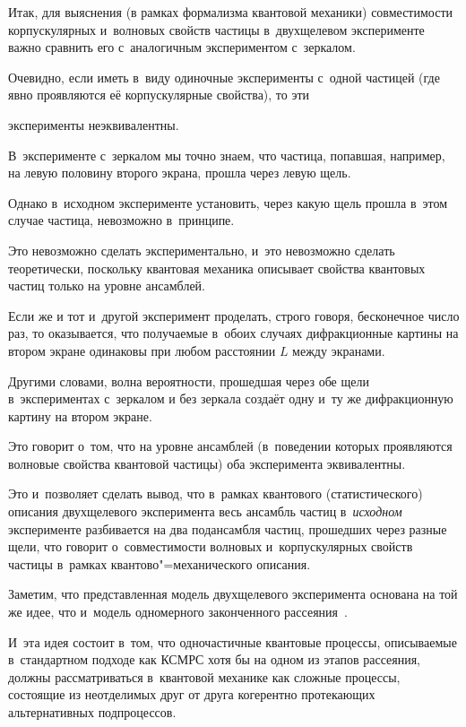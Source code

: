 \smallskip




Итак, для выяснения (в рамках формализма квантовой механики) совместимости корпускулярных и~волновых свойств частицы в~двухщелевом эксперименте важно сравнить его с~аналогичным экспериментом с~зеркалом. 

Очевидно, если иметь в~виду одиночные эксперименты с~одной частицей (где явно проявляются её корпускулярные свойства), то эти

эксперименты неэквивалентны. 

В~эксперименте с~зеркалом мы точно знаем, что частица, попавшая, например, на левую половину второго экрана, прошла через левую щель. 

Однако в~исходном эксперименте установить, через какую щель прошла в~этом случае частица, невозможно в~принципе. 

Это невозможно сделать экспериментально, и~это невозможно сделать теоретически, поскольку квантовая механика описывает свойства квантовых частиц только на уровне ансамблей.



Если же и тот и~другой эксперимент проделать, строго говоря, бесконечное число раз, то оказывается, что получаемые в~обоих случаях дифракционные картины на втором экране одинаковы при любом расстоянии $L$ между экранами. 

Другими словами, волна вероятности, прошедшая через обе щели в~экспериментах с~зеркалом и без зеркала создаёт одну и~ту же дифракционную картину на втором экране. 

Это говорит о~том, что на уровне ансамблей (в~поведении которых проявляются волновые свойства квантовой частицы) оба эксперимента эквивалентны. 

Это и~позволяет сделать вывод, что в~рамках квантового (статистического) описания двухщелевого эксперимента весь ансамбль частиц в~{\it исходном} эксперименте разбивается на два подансамбля частиц, прошедших через разные щели, что говорит о~совместимости волновых и~корпускулярных свойств частицы в~рамках квантово"=механического описания.



Заметим, что представленная модель двухщелевого эксперимента основана на той же идее, что и~модель одномерного законченного рассеяния~\cite{chup:Ch3}. 

И~эта идея состоит в~том, что одночастичные квантовые процессы, описываемые в~стандартном подходе как КСМРС хотя бы на одном из этапов рассеяния, должны рассматриваться в~квантовой механике как сложные процессы, состоящие из неотделимых друг от друга когерентно протекающих альтернативных подпроцессов.

